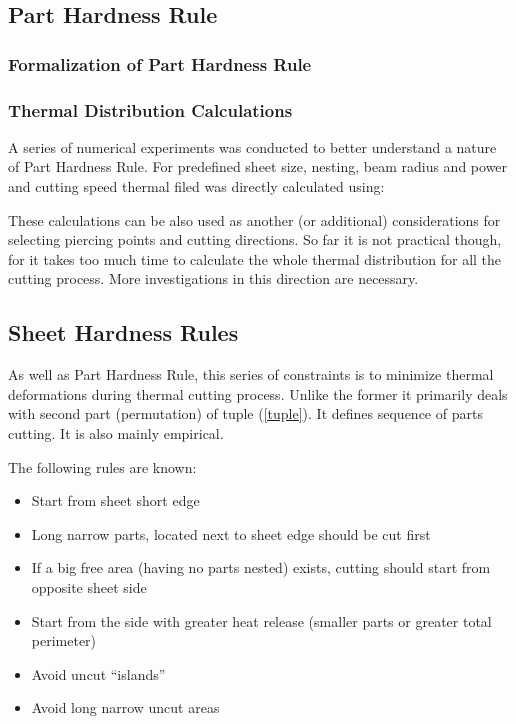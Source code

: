 \documentclass{../download/tPRS2e}
\begin{document}
\subsection{Part Hardness Rule}

\subsubsection{Formalization of Part Hardness Rule}

\subsubsection{Thermal Distribution Calculations}

A series of numerical experiments was conducted to better understand a nature of Part Hardness Rule.
For predefined sheet size, nesting, beam radius and power and cutting speed thermal filed was directly calculated using:

These calculations can be also used as another (or additional) considerations for selecting piercing points and cutting directions.
So far it is not practical though, for it takes too much time to calculate the whole thermal distribution for all the cutting process.
More investigations in this direction are necessary.

\subsection{Sheet Hardness Rules}

As well as Part Hardness Rule, this series of constraints is to minimize thermal deformations during thermal cutting process.
Unlike the former it primarily deals with second part (permutation) of tuple (\ref{tuple}).
It defines sequence of parts cutting. It is also mainly empirical.

The following rules are known:

\begin{itemize}
\item Start from sheet short edge
\item Long narrow parts, located next to sheet edge should be cut first
\item If a big free area (having no parts nested) exists, cutting should start from opposite sheet side
\item Start from the side with greater heat release (smaller parts or greater total perimeter)
\item Avoid uncut “islands”
\item Avoid long narrow uncut areas
\end{itemize}
\end{document}
